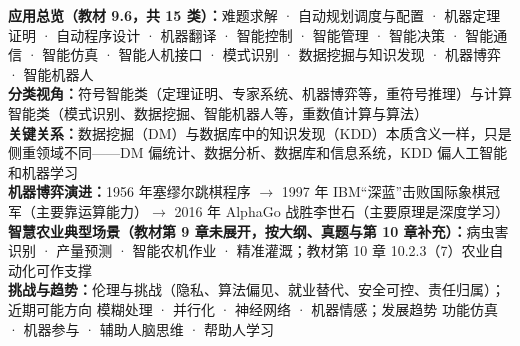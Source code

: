 \documentclass[a4paper,11pt]{article}
\begin{document}

\begin{knowmap}
\textbf{应用总览（教材 9.6，共 15 类）：}难题求解 · 自动规划调度与配置 · 机器定理证明 · 自动程序设计 · 机器翻译 · 智能控制 · 智能管理 · 智能决策 · 智能通信 · 智能仿真 · 智能人机接口 · 模式识别 · 数据挖掘与知识发现 · 机器博弈 · 智能机器人\\[2pt]
\textbf{分类视角：}符号智能类（定理证明、专家系统、机器博弈等，重符号推理）与计算智能类（模式识别、数据挖掘、智能机器人等，重数值计算与算法）\\[2pt]
\textbf{关键关系：}数据挖掘（DM）与数据库中的知识发现（KDD）本质含义一样，只是侧重领域不同——DM 偏统计、数据分析、数据库和信息系统，KDD 偏人工智能和机器学习\\[2pt]
\textbf{机器博弈演进：}1956 年塞缪尔跳棋程序 $\rightarrow$ 1997 年 IBM“深蓝”击败国际象棋冠军（主要靠运算能力）$\rightarrow$ 2016 年 AlphaGo 战胜李世石（主要原理是深度学习）\\[2pt]
\textbf{智慧农业典型场景（教材第 9 章未展开，按大纲、真题与第 10 章补充）：}病虫害识别 · 产量预测 · 智能农机作业 · 精准灌溉；教材第 10 章 10.2.3（7）农业自动化可作支撑\\[2pt]
\textbf{挑战与趋势：}伦理与挑战（隐私、算法偏见、就业替代、安全可控、责任归属）；近期可能方向 模糊处理 · 并行化 · 神经网络 · 机器情感；发展趋势 功能仿真 · 机器参与 · 辅助人脑思维 · 帮助人学习
\end{knowmap}
\end{document}
